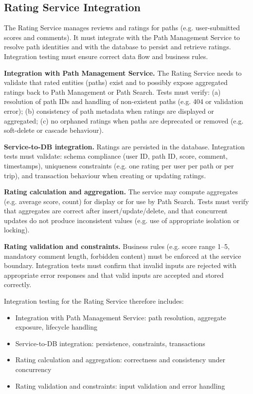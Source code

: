 \subsection{Rating Service Integration}
\label{subsec:rating_service_integration}%

The Rating Service manages reviews and ratings for paths (e.g. user-submitted scores and comments). It must integrate with the Path Management Service to resolve path identities and with the database to persist and retrieve ratings. Integration testing must ensure correct data flow and business rules.

\textbf{Integration with Path Management Service.}
The Rating Service needs to validate that rated entities (paths) exist and to possibly expose aggregated ratings back to Path Management or Path Search. Tests must verify: (a) resolution of path IDs and handling of non-existent paths (e.g. 404 or validation error); (b) consistency of path metadata when ratings are displayed or aggregated; (c) no orphaned ratings when paths are deprecated or removed (e.g. soft-delete or cascade behaviour).

\textbf{Service-to-DB integration.}
Ratings are persisted in the database. Integration tests must validate: schema compliance (user ID, path ID, score, comment, timestamps), uniqueness constraints (e.g. one rating per user per path or per trip), and transaction behaviour when creating or updating ratings.

\textbf{Rating calculation and aggregation.}
The service may compute aggregates (e.g. average score, count) for display or for use by Path Search. Tests must verify that aggregates are correct after insert/update/delete, and that concurrent updates do not produce inconsistent values (e.g. use of appropriate isolation or locking).

\textbf{Rating validation and constraints.}
Business rules (e.g. score range 1--5, mandatory comment length, forbidden content) must be enforced at the service boundary. Integration tests must confirm that invalid inputs are rejected with appropriate error responses and that valid inputs are accepted and stored correctly.

Integration testing for the Rating Service therefore includes:
\begin{itemize}
    \item Integration with Path Management Service: path resolution, aggregate exposure, lifecycle handling
    \item Service-to-DB integration: persistence, constraints, transactions
    \item Rating calculation and aggregation: correctness and consistency under concurrency
    \item Rating validation and constraints: input validation and error handling
\end{itemize}

